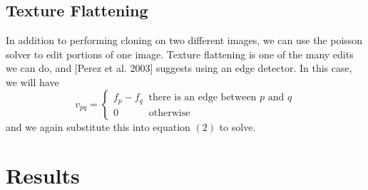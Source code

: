 \documentclass[12pt]{article}
\begin{document}
\subsection{Texture Flattening}
In addition to performing cloning on two different images, we can use the poisson solver to edit portions of one image. Texture flattening is one of the many edits we can do, and [Perez et al. 2003] suggests using an edge detector. In this case, we will have
\begin{equation}
v_{pq} = 
\begin{cases}
f_p-f_q \;\; \textrm{there is an edge between $p$ and $q$}\\
0 \;\;\;\;\;\;\;\;\;\;\; \textrm{otherwise}
\end{cases}
\end{equation}
and we again substitute this into equation $(2)$ to solve. 

\section{Results} 
\end{document}

